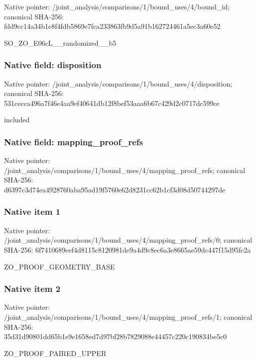 \documentclass[10pt,a4paper]{article}
\begin{document}
Native pointer: /joint\_analysis/comparis\allowbreak{}ons/1/bound\_uses/4/bound\allowbreak{}\_id; canonical SHA-256: fdd9cc14a34b1e8f4fdb5869\allowbreak{}e7fca233863fb9d5a91b1627\allowbreak{}24461a5ec3a60e52


SO\_ZO\_E06cL\_\_randomized\_\_b5


\subsubsection{Native field: disposition}


Native pointer: /joint\_analysis/comparis\allowbreak{}ons/1/bound\_uses/4/dispo\allowbreak{}sition; canonical SHA-256: 531cecca496a7f46e4aa9ef4\allowbreak{}0641db12f8bef53aaa6b67c4\allowbreak{}29d2c0717dc599ce


included


\subsubsection{Native field: mapping\_proof\_refs}


Native pointer: /joint\_analysis/comparis\allowbreak{}ons/1/bound\_uses/4/mappi\allowbreak{}ng\_proof\_refs; canonical SHA-256: d6397c3d74ea4928760aba95\allowbreak{}ad19f5760e62d8231cc62b1c\allowbreak{}f3d08d50744297de



\subsubsection{Native item 1}


Native pointer: /joint\_analysis/comparis\allowbreak{}ons/1/bound\_uses/4/mappi\allowbreak{}ng\_proof\_refs/0; canonical SHA-256: 6f7410689eef4d8115c81209\allowbreak{}81de9a4d9c8ec6a3e8665ae5\allowbreak{}9dc447f15d95fc2a


ZO\_PROOF\_GEOMETRY\_BASE


\subsubsection{Native item 2}


Native pointer: /joint\_analysis/comparis\allowbreak{}ons/1/bound\_uses/4/mappi\allowbreak{}ng\_proof\_refs/1; canonical SHA-256: 35d31d90801dd65b1e9e1658\allowbreak{}ed7d97bf28b7829088e44457\allowbreak{}c220c190834be5c0


ZO\_PROOF\_PAIRED\_UPPER
\end{document}
